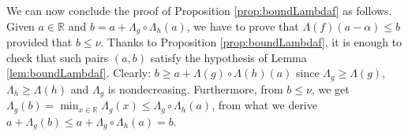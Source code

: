 \documentclass{sig-alternate}
\newtheorem{rem}[theo]{Remark}
\newcommand{\Z}{\mathbb Z}
\newcommand{\R}{\mathbb R}
\renewcommand{\O}{\mathcal O}
\newcommand{\id}{\textrm{id}}
\begin{document}

We can now conclude the proof of Proposition \ref{prop:boundLambdaf} as 
follows. Given $a \in \R$ and $b = a + \Lambda_g \circ \Lambda_h(a)$, we 
have to prove that $\Lambda(f)(a-\alpha) \leq b$ provided that $b \leq 
\nu$. Thanks to Proposition \ref{prop:boundLambdaf}, it is enough to 
check that such pairs $(a,b)$ satisfy the hypothesis of Lemma
\ref{lem:boundLambdaf}. Clearly:
$b \geq a + \Lambda(g) \circ \Lambda(h)(a)$
since $\Lambda_g \geq \Lambda(g)$, $\Lambda_h \geq \Lambda(h)$ and
$\Lambda_g$ is nondecreasing. Furthermore, from $b \leq \nu$, we get
$\Lambda_g(b) = \min_{x \in \R} \Lambda_g(x) \leq \Lambda_g \circ 
\Lambda_h(a)$, from what we derive 
$a + \Lambda_g(b) \leq a + \Lambda_g \circ \Lambda_h(a) = b$.



\end{document}
